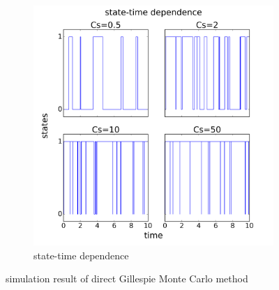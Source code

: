 \begin{figure}[H]
\begin{subfigure}{0.46\textwidth}
		\includegraphics[scale=0.33]{img/state1.png}
		\caption{state-time dependence}
		\end{subfigure}
		\caption{simulation result of direct Gillespie Monte Carlo method}
		\label{img:direct_result}
	\end{figure}

